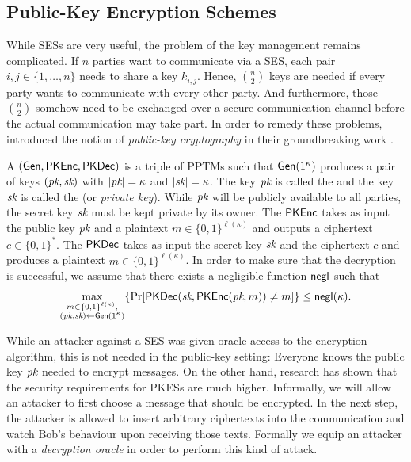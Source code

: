 \subsection*{Public-Key Encryption Schemes}
While \acp{SES} are very useful, the problem of the key management
remains complicated. If $n$ parties want to communicate via a \ac{SES},
each pair $i,j\in \{1,\ldots,n\}$ needs to share a key $k_{i,j}$. Hence,
$\binom{n}{2}$ keys are needed if every party wants to communicate with
every other party. And furthermore, those $\binom{n}{2}$ somehow need to
be exchanged over a secure communication channel before the actual
communication may take part. In order to remedy these problems,
\citeauthor{diffie1976publickey} introduced the notion of
\emph{public-key cryptography} in their groundbreaking work
\cite{diffie1976publickey}. 

A  $(\operatorname{\mathsf{Gen}},\operatorname{\mathsf{PKEnc}},\operatorname{\mathsf{PKDec}})$ is a triple of \acp{PPTM}
such that $\operatorname{\mathsf{Gen}}(1^{\kappa})$ produces a pair of keys $(\textit{pk},\textit{sk})$ with
$|\textit{pk}| = \kappa$ and $|\textit{sk}| =  \kappa$. The key $\textit{pk}$ is called the
 and the key $\textit{sk}$ is called the 
(or \emph{private key}). While $\textit{pk}$ will be publicly available to all
parties, the secret key $\textit{sk}$ must be kept private by its owner. The
 $\operatorname{\mathsf{PKEnc}}$ takes as input the
public key $\textit{pk}$ and a plaintext $m\in \{0,1\}^{\ell(\kappa)}$ and
outputs a ciphertext $c\in \{0,1\}^{*}$. The  $\operatorname{\mathsf{PKDec}}$ takes as input the secret key $\textit{sk}$ and the
ciphertext $c$ and produces a plaintext $m\in
\{0,1\}^{\ell(\kappa)}$. In order to make sure that the decryption
is successful, we assume that there exists a negligible function $\operatorname{\mathsf{negl}}$
such that 
\begin{align*}
\max_{\substack{m\in \{0,1\}^{\ell(\kappa)},\\(\textit{pk},\textit{sk})\gets \operatorname{\mathsf{Gen}}(1^{\kappa})}}\{\Pr[\operatorname{\mathsf{PKDec}}(\textit{sk},\operatorname{\mathsf{PKEnc}}(\textit{pk},m))\neq
m]\}\leq\operatorname{\mathsf{negl}}(\kappa).   
\end{align*}



While an attacker against a \ac{SES} was given oracle access to the
encryption algorithm, this is not needed in the public-key setting:
Everyone knows the public key $\textit{pk}$ needed to encrypt messages. On the
other hand, research has shown that the security requirements for
\acp{PKES} are much higher. Informally, we will allow an attacker to
first choose a message that should be encrypted. In the next step, the
attacker is allowed to insert arbitrary ciphertexts into the
communication and watch Bob's behaviour upon receiving those
texts. Formally we equip an attacker with a
\emph{decryption oracle} in order to perform this kind of attack. 

